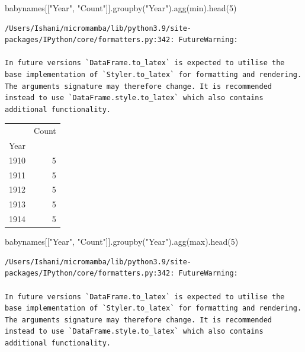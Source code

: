 \documentclass[
  letterpaper,
  DIV=11,
  numbers=noendperiod]{scrreprt}
\newenvironment{Shaded}{\begin{snugshade}}{\end{snugshade}}
\newcommand{\BuiltInTok}[1]{\textcolor[rgb]{0.00,0.23,0.31}{#1}}
\newcommand{\DecValTok}[1]{\textcolor[rgb]{0.68,0.00,0.00}{#1}}
\newcommand{\NormalTok}[1]{\textcolor[rgb]{0.00,0.23,0.31}{#1}}
\newcommand{\StringTok}[1]{\textcolor[rgb]{0.13,0.47,0.30}{#1}}
\begin{document}
\begin{Shaded}
\begin{Highlighting}[]
\NormalTok{babynames[[}\StringTok{"Year"}\NormalTok{, }\StringTok{"Count"}\NormalTok{]].groupby(}\StringTok{"Year"}\NormalTok{).agg(}\BuiltInTok{min}\NormalTok{).head(}\DecValTok{5}\NormalTok{)}
\end{Highlighting}
\end{Shaded}

\begin{verbatim}
/Users/Ishani/micromamba/lib/python3.9/site-packages/IPython/core/formatters.py:342: FutureWarning:

In future versions `DataFrame.to_latex` is expected to utilise the base implementation of `Styler.to_latex` for formatting and rendering. The arguments signature may therefore change. It is recommended instead to use `DataFrame.style.to_latex` which also contains additional functionality.
\end{verbatim}

\begin{tabular}{lr}
\toprule
{} &  Count \\
Year &        \\
\midrule
1910 &      5 \\
1911 &      5 \\
1912 &      5 \\
1913 &      5 \\
1914 &      5 \\
\bottomrule
\end{tabular}

\begin{Shaded}
\begin{Highlighting}[]
\NormalTok{babynames[[}\StringTok{"Year"}\NormalTok{, }\StringTok{"Count"}\NormalTok{]].groupby(}\StringTok{"Year"}\NormalTok{).agg(}\BuiltInTok{max}\NormalTok{).head(}\DecValTok{5}\NormalTok{)}
\end{Highlighting}
\end{Shaded}

\begin{verbatim}
/Users/Ishani/micromamba/lib/python3.9/site-packages/IPython/core/formatters.py:342: FutureWarning:

In future versions `DataFrame.to_latex` is expected to utilise the base implementation of `Styler.to_latex` for formatting and rendering. The arguments signature may therefore change. It is recommended instead to use `DataFrame.style.to_latex` which also contains additional functionality.
\end{verbatim}
\end{document}
